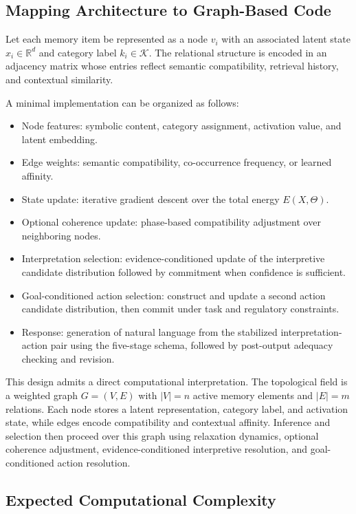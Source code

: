 \documentclass[10pt,journal,compsoc]{IEEEtran}
\begin{document}
\subsection{Mapping Architecture to Graph-Based Code}

Let each memory item be represented as a node $v_i$ with an associated latent state $x_i \in \mathbb{R}^{d}$ and category label $k_i \in \mathcal{K}$. The relational structure is encoded in an adjacency matrix whose entries reflect semantic compatibility, retrieval history, and contextual similarity.

A minimal implementation can be organized as follows:
\begin{itemize}
    \item Node features: symbolic content, category assignment, activation value, and latent embedding.
    \item Edge weights: semantic compatibility, co-occurrence frequency, or learned affinity.
    \item State update: iterative gradient descent over the total energy $E(X,\Theta)$.
    \item Optional coherence update: phase-based compatibility adjustment over neighboring nodes.
    \item Interpretation selection: evidence-conditioned update of the interpretive candidate distribution followed by commitment when confidence is sufficient.
    \item Goal-conditioned action selection: construct and update a second action candidate distribution, then commit under task and regulatory constraints.
    \item Response: generation of natural language from the stabilized interpretation-action pair using the five-stage schema, followed by post-output adequacy checking and revision.
\end{itemize}

This design admits a direct computational interpretation. The topological field is a weighted graph $G=(V,E)$ with $|V|=n$ active memory elements and $|E|=m$ relations. Each node stores a latent representation, category label, and activation state, while edges encode compatibility and contextual affinity. Inference and selection then proceed over this graph using relaxation dynamics, optional coherence adjustment, evidence-conditioned interpretive resolution, and goal-conditioned action resolution.

\subsection{Expected Computational Complexity}
\end{document}
